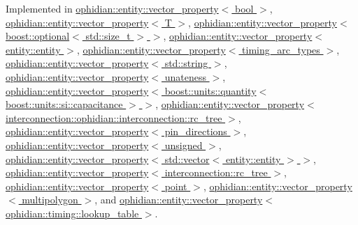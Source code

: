 Implemented in \hyperlink{classophidian_1_1entity_1_1vector__property_3_01bool_01_4_a3a00eae6f787b0d5cb5b782c931f2774}{ophidian\-::entity\-::vector\-\_\-property$<$ bool $>$}, \hyperlink{classophidian_1_1entity_1_1vector__property_a15ebc0490d8232671cd9111f11351acf}{ophidian\-::entity\-::vector\-\_\-property$<$ T $>$}, \hyperlink{classophidian_1_1entity_1_1vector__property_a15ebc0490d8232671cd9111f11351acf}{ophidian\-::entity\-::vector\-\_\-property$<$ boost\-::optional$<$ std\-::size\-\_\-t $>$ $>$}, \hyperlink{classophidian_1_1entity_1_1vector__property_a15ebc0490d8232671cd9111f11351acf}{ophidian\-::entity\-::vector\-\_\-property$<$ entity\-::entity $>$}, \hyperlink{classophidian_1_1entity_1_1vector__property_a15ebc0490d8232671cd9111f11351acf}{ophidian\-::entity\-::vector\-\_\-property$<$ timing\-\_\-arc\-\_\-types $>$}, \hyperlink{classophidian_1_1entity_1_1vector__property_a15ebc0490d8232671cd9111f11351acf}{ophidian\-::entity\-::vector\-\_\-property$<$ std\-::string $>$}, \hyperlink{classophidian_1_1entity_1_1vector__property_a15ebc0490d8232671cd9111f11351acf}{ophidian\-::entity\-::vector\-\_\-property$<$ unateness $>$}, \hyperlink{classophidian_1_1entity_1_1vector__property_a15ebc0490d8232671cd9111f11351acf}{ophidian\-::entity\-::vector\-\_\-property$<$ boost\-::units\-::quantity$<$ boost\-::units\-::si\-::capacitance $>$ $>$}, \hyperlink{classophidian_1_1entity_1_1vector__property_a15ebc0490d8232671cd9111f11351acf}{ophidian\-::entity\-::vector\-\_\-property$<$ interconnection\-::ophidian\-::interconnection\-::rc\-\_\-tree $>$}, \hyperlink{classophidian_1_1entity_1_1vector__property_a15ebc0490d8232671cd9111f11351acf}{ophidian\-::entity\-::vector\-\_\-property$<$ pin\-\_\-directions $>$}, \hyperlink{classophidian_1_1entity_1_1vector__property_a15ebc0490d8232671cd9111f11351acf}{ophidian\-::entity\-::vector\-\_\-property$<$ unsigned $>$}, \hyperlink{classophidian_1_1entity_1_1vector__property_a15ebc0490d8232671cd9111f11351acf}{ophidian\-::entity\-::vector\-\_\-property$<$ std\-::vector$<$ entity\-::entity $>$ $>$}, \hyperlink{classophidian_1_1entity_1_1vector__property_a15ebc0490d8232671cd9111f11351acf}{ophidian\-::entity\-::vector\-\_\-property$<$ interconnection\-::rc\-\_\-tree $>$}, \hyperlink{classophidian_1_1entity_1_1vector__property_a15ebc0490d8232671cd9111f11351acf}{ophidian\-::entity\-::vector\-\_\-property$<$ point $>$}, \hyperlink{classophidian_1_1entity_1_1vector__property_a15ebc0490d8232671cd9111f11351acf}{ophidian\-::entity\-::vector\-\_\-property$<$ multipolygon $>$}, and \hyperlink{classophidian_1_1entity_1_1vector__property_a15ebc0490d8232671cd9111f11351acf}{ophidian\-::entity\-::vector\-\_\-property$<$ ophidian\-::timing\-::lookup\-\_\-table $>$}.

